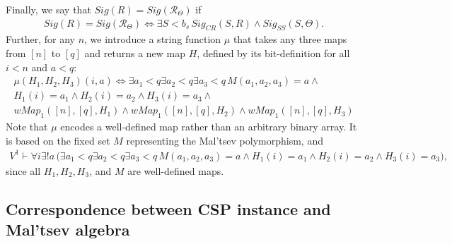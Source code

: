 \documentclass{article}
\theoremstyle{definition}
\theoremstyle{theorem}
\theoremstyle{theorem}
\theoremstyle{remark}
\theoremstyle{remark}
\theoremstyle{example}
\theoremstyle{notation}
\theoremstyle{theorem}
\begin{document}
Finally, we say that $Sig(R) = Sig(\mathscr{R}_{\Theta})$ if
\begin{equation}\label{akajsgdfl7}
    \begin{gathered}
        Sig(R)=Sig(\mathscr{R}_{\Theta}) \iff \exists S< b_s\, Sig_{CR}(S,R)\wedge Sig_{SS}(S,\Theta).
    \end{gathered}
\end{equation}
Further, for any $n$, we introduce a string function $\mu$ that takes any three maps from $[n]$ to $[q]$ and returns a new map $H$, defined by its bit-definition for all $i < n$ and $a < q$:
\begin{equation}\label{alalkdhjhfr}
  \begin{gathered}
     \mu(H_1, H_2, H_3)(i,a)\iff \exists a_1<q\exists a_2<q\exists a_3<q\,M(a_1,a_2,a_3)=a\wedge\\
       \hspace {0pt}H_1(i)=a_1\wedge H_2(i)=a_2\wedge H_3(i)=a_3\wedge\\
       wMap_1([n],[q],H_1) \wedge wMap_1([n],[q],H_2)\wedge wMap_1([n],[q],H_3)
  \end{gathered}
\end{equation}
Note that $\mu$ encodes a well-defined map rather than an arbitrary binary array. It is based on the fixed set $M$ representing the Mal'tsev polymorphism, and 
\begin{equation}
    \begin{gathered}
V^1\vdash\forall i\exists ! a\, \big( \exists a_1<q\exists a_2<q\exists a_3<q\,M(a_1,a_2,a_3)=a\wedge H_1(i)=a_1\wedge H_2(i)=a_2\wedge H_3(i)=a_3\big),
    \end{gathered}
\end{equation}
since all $H_1, H_2, H_3$, and $M$ are well-defined maps.



\subsection{Correspondence between CSP instance and Mal'tsev algebra}\label{lh;alkdhg;lih;}
\end{document}
